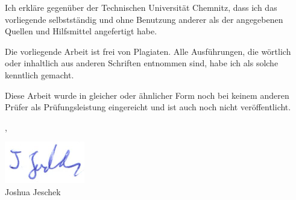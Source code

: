 \begin{tucerklaerung}
  \vspace{1em}\noindent
  Ich erkläre gegenüber der Technischen Universität Chemnitz, dass ich das vorliegende \type{} selbstständig und ohne Benutzung anderer als der angegebenen Quellen und Hilfsmittel angefertigt habe.

  \vspace{1em}\noindent
  Die vorliegende Arbeit ist frei von Plagiaten. Alle Ausführungen, die wörtlich oder inhaltlich aus anderen Schriften entnommen sind, habe ich als solche kenntlich gemacht.

  \vspace{1em}\noindent
  Diese Arbeit wurde in gleicher oder ähnlicher Form noch bei keinem anderen Prüfer als Prüfungsleistung eingereicht und ist auch noch nicht veröffentlicht.


  \begin{flushright}
    \place, \makeatletter\@date\makeatother
  \end{flushright}
  \vspace{\baselineskip}
  \begin{flushright}
    \includegraphics[height=2.5\baselineskip]{assets/signature.pdf}\\
    Joshua Jeschek
  \end{flushright}
\end{tucerklaerung}

